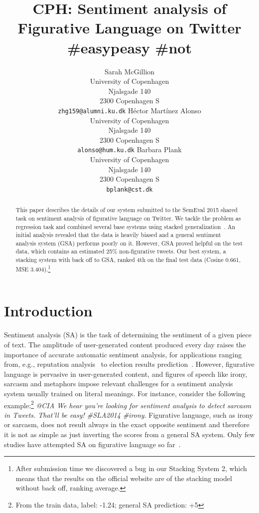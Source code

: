 \documentclass[11pt,letterpaper]{article}
\title{CPH: Sentiment analysis of Figurative Language on Twitter \#easypeasy \#not}
\author{Sarah McGillion\\
		University of Copenhagen\\
  	Njalsgade 140 \\
  	2300 Copenhagen S\\
		    {\tt  zhg159@alumni.ku.dk}  
	    	 \And
	H\'{e}ctor Mart\'{i}nez Alonso\\
  	University of Copenhagen\\
  	Njalsgade 140 \\
  	2300 Copenhagen S\\
	  {\tt alonso@hum.ku.dk}
		\And
		Barbara Plank\\
  	University of Copenhagen\\
  	Njalsgade 140 \\
  	2300 Copenhagen S\\
  {\tt bplank@cst.dk}
}
\date{}
\begin{document}
\maketitle
\begin{abstract}
 This paper describes the details of our system submitted to the SemEval 2015 shared task on sentiment analysis of figurative language on Twitter. We tackle the problem as regression task and combined several base systems using stacked generalization~\cite{Wolpert:1992}. An initial analysis revealed that the data is heavily biased and a general sentiment analysis system (GSA) performs poorly on it. However, GSA proved helpful on the test data, which contains an estimated 25\% non-figurative tweets. Our best system, a stacking system with back off to GSA, ranked 4th on the final test data (Cosine 0.661, MSE 3.404).\footnote{After submission time we discovered a bug in our Stacking System 2, which means that the results on the official website are of the stacking model without back off, ranking average.}
 
\end{abstract}

\section{Introduction}
Sentiment analysis (SA) is the task of determining the sentiment of a given piece of text.
 The amplitude of user-generated content produced every day raises the importance of accurate automatic sentiment analysis, for applications ranging from, e.g., reputation analysis~\cite{amigo2013overview} to election results prediction~\cite{sang2012predicting}. However, figurative language is pervasive in user-generated content, and figures of speech like irony, sarcasm and metaphors impose relevant challenges for a sentiment analysis system usually trained on literal meanings.
For instance, consider the following example:\footnote{From the train data, label: -1.24; general SA prediction: +5} {\em @CIA We hear you're looking for sentiment analysis to detect sarcasm in Tweets. That'll be easy! \#SLA2014 \#irony}. %
 Figurative language, such as irony or sarcasm, does not result always in the exact opposite sentiment and therefore it is not as simple as just inverting the scores from a general SA system.
Only few studies have attempted SA on figurative language so far~\cite{reyes2012making,reyes2013multidimensional}.
\end{document}
